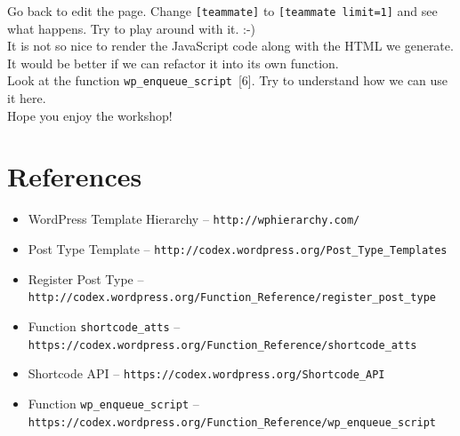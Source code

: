 \documentclass{article}
\begin{document}
\noindent Go back to edit the page. Change {\tt [teammate]} to {\tt [teammate
limit=1]} and see what happens. Try to play around with it. :-) \\

 It is not so nice to render the JavaScript code
along with the HTML we generate. It would be better if we can refactor it into
its own function. \\

 Look at the function {\tt wp\_enqueue\_script}~[6]. Try
to understand how we can use it here. \\

\noindent Hope you enjoy the workshop!

\section*{References}

\begin{itemize}
    \item[1] WordPress Template Hierarchy -- {\tt http://wphierarchy.com/}
    \item[2] Post Type Template -- {\tt http://codex.wordpress.org/Post\_Type\_Templates}
    \item[3] Register Post Type -- {\tt http://codex.wordpress.org/Function\_Reference/register\_post\_type}
    \item[4] Function {\tt shortcode\_atts} -- {\tt https://codex.wordpress.org/Function\_Reference/shortcode\_atts}
    \item[5] Shortcode API -- {\tt https://codex.wordpress.org/Shortcode\_API}
    \item[6] Function {\tt wp\_enqueue\_script} -- {\tt https://codex.wordpress.org/Function\_Reference/wp\_enqueue\_script}
\end{itemize}
\end{document}
